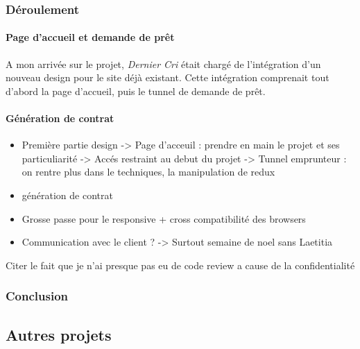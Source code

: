 \bigskip

\subsubsection{Déroulement}\label{duxe9roulement-1}

\paragraph{Page d'accueil et demande de
prêt}\label{page-daccueil-et-demande-de-pruxeat}

\bigskip

A mon arrivée sur le projet, \emph{Dernier Cri} était chargé de
l'intégration d'un nouveau design pour le site déjà existant. Cette
intégration comprenait tout d'abord la page d'accueil, puis le tunnel de
demande de prêt.

\bigskip

\bigskip

\paragraph{Génération de contrat}\label{guxe9nuxe9ration-de-contrat}

\bigskip

\bigskip

\begin{itemize}
\item
  Première partie design -\textgreater{} Page d'acceuil : prendre en
  main le projet et ses particuliarité -\textgreater{} Accés restraint
  au debut du projet -\textgreater{} Tunnel emprunteur : on rentre plus
  dans le techniques, la manipulation de redux
\item
  génération de contrat
\item
  Grosse passe pour le responsive + cross compatibilité des browsers
\item
  Communication avec le client ? -\textgreater{} Surtout semaine de noel
  sans Laetitia
\end{itemize}

Citer le fait que je n'ai presque pas eu de code review a cause de la
confidentialité

\subsubsection{Conclusion}\label{conclusion-1}

\subsection{Autres projets}\label{autres-projets}

